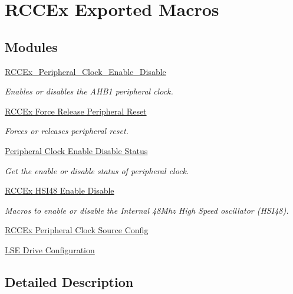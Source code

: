 \hypertarget{group___r_c_c_ex___exported___macros}{}\section{R\+C\+C\+Ex Exported Macros}
\label{group___r_c_c_ex___exported___macros}
\subsection*{Modules}
\begin{DoxyCompactItemize}
\item 
\hyperlink{group___r_c_c_ex___peripheral___clock___enable___disable}{R\+C\+C\+Ex\+\_\+\+Peripheral\+\_\+\+Clock\+\_\+\+Enable\+\_\+\+Disable}
\begin{DoxyCompactList}\small\item\em Enables or disables the A\+H\+B1 peripheral clock. \end{DoxyCompactList}\item 
\hyperlink{group___r_c_c_ex___force___release___peripheral___reset}{R\+C\+C\+Ex Force Release Peripheral Reset}
\begin{DoxyCompactList}\small\item\em Forces or releases peripheral reset. \end{DoxyCompactList}\item 
\hyperlink{group___r_c_c_ex___peripheral___clock___enable___disable___status}{Peripheral Clock Enable Disable Status}
\begin{DoxyCompactList}\small\item\em Get the enable or disable status of peripheral clock. \end{DoxyCompactList}\item 
\hyperlink{group___r_c_c_ex___h_s_i48___enable___disable}{R\+C\+C\+Ex H\+S\+I48 Enable Disable}
\begin{DoxyCompactList}\small\item\em Macros to enable or disable the Internal 48\+Mhz High Speed oscillator (H\+S\+I48). \end{DoxyCompactList}\item 
\hyperlink{group___r_c_c_ex___peripheral___clock___source___config}{R\+C\+C\+Ex Peripheral Clock Source Config}
\item 
\hyperlink{group___r_c_c_ex___l_s_e___configuration}{L\+S\+E Drive Configuration}
\end{DoxyCompactItemize}


\subsection{Detailed Description}
